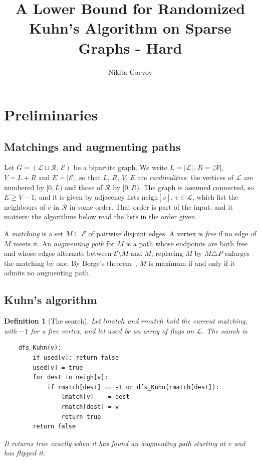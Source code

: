\documentclass[10pt]{article}
\title{A Lower Bound for Randomized Kuhn's Algorithm on Sparse Graphs - Hard}
\author{Nikita Gaevoy}
\date{}
\newtheorem{definition}{Definition}
\begin{document}
\maketitle

\section{Preliminaries}

\subsection{Matchings and augmenting paths}

Let $G=(\mathcal{L}\sqcup\mathcal{R},\,\mathcal{E})$ be a bipartite graph. We
write $L=|\mathcal{L}|$, $R=|\mathcal{R}|$, $V=L+R$ and $E=|\mathcal{E}|$, so
that $L$, $R$, $V$, $E$ are \emph{cardinalities}; the vertices of $\mathcal{L}$
are numbered by $[0,L)$ and those of $\mathcal{R}$ by $[0,R)$. The graph is
assumed connected, so $E\ge V-1$, and it is given by adjacency lists
$\mathrm{neigh}[v]$, $v\in\mathcal{L}$, which list the neighbours of $v$ in
$\mathcal{R}$ in some order. That order is part of the input, and it matters:
the algorithms below read the lists in the order given.

A \emph{matching} is a set $M\subseteq\mathcal{E}$ of pairwise disjoint edges.
A vertex is \emph{free} if no edge of $M$ meets it. An \emph{augmenting path}
for $M$ is a path whose endpoints are both free and whose edges alternate
between $\mathcal{E}\setminus M$ and $M$; replacing $M$ by $M\triangle P$
enlarges the matching by one. By Berge's theorem~\cite{Berge57}, $M$ is maximum
if and only if it admits no augmenting path.

\subsection{Kuhn's algorithm}

\begin{definition}[The search]\label{def:dfs}
Let $\mathit{lmatch}$ and $\mathit{rmatch}$ hold the current matching, with
$-1$ for a free vertex, and let $\mathit{used}$ be an array of flags on
$\mathcal{L}$. The search is
\begin{verbatim}
    dfs_Kuhn(v):
        if used[v]: return false
        used[v] = true
        for dest in neigh[v]:
            if rmatch[dest] == -1 or dfs_Kuhn(rmatch[dest]):
                lmatch[v]    = dest
                rmatch[dest] = v
                return true
        return false
\end{verbatim}
It returns true exactly when it has found an augmenting path starting at $v$ and
has flipped it.
\end{definition}
\end{document}
